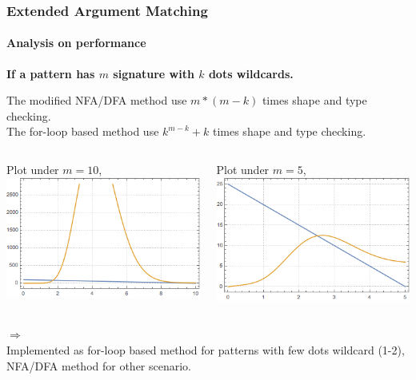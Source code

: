 \documentclass[10pt]{beamer}
\begin{document}
\begin{frame}[fragile]
\frametitle{Extended Argument Matching}
\framesubtitle{Analysis on performance}
\textbf{If a pattern has $m$ signature with $k$ dots wildcards.}

The modified NFA/DFA method use $m * (m-k)$ times shape and type checking.   \\
The for-loop based method use $k^{m-k} + k$ times shape and type checking.   \\
\begin{columns}
\begin{column}[T]{0.5\textwidth}
Plot under $m = 10$,                                                         \\
\includegraphics[scale=0.4]{plot}    
\end{column}
\begin{column}[T]{0.5\textwidth}
Plot under $m = 5$,                                                          \\
\includegraphics[scale=0.4]{plot_small}    
\end{column}
\end{columns}
$\Rightarrow$                                                                \\
Implemented as for-loop based method for patterns with few dots wildcard
(1-2), NFA/DFA method for other scenario.
\end{frame}
\end{document}
